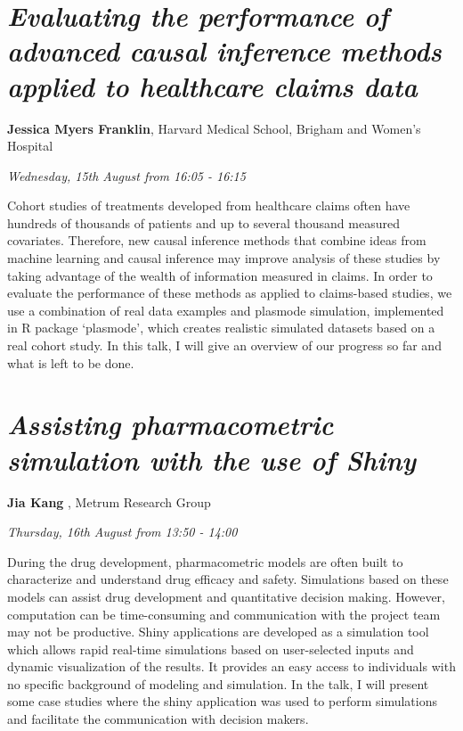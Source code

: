 \documentclass[]{book}
\theoremstyle{definition}
\theoremstyle{definition}
\theoremstyle{definition}
\theoremstyle{remark}
\begin{document}
\hypertarget{evaluating-the-performance-of-advanced-causal-inference-methods-applied-to-healthcare-claims-data}{%
\section{\texorpdfstring{\emph{Evaluating the performance of advanced
causal inference methods applied to healthcare claims
data}}{Evaluating the performance of advanced causal inference methods applied to healthcare claims data}}\label{evaluating-the-performance-of-advanced-causal-inference-methods-applied-to-healthcare-claims-data}}

\textbf{Jessica Myers Franklin}, Harvard Medical School, Brigham and
Women's Hospital

\emph{Wednesday, 15th August from 16:05 - 16:15}

Cohort studies of treatments developed from healthcare claims often have
hundreds of thousands of patients and up to several thousand measured
covariates. Therefore, new causal inference methods that combine ideas
from machine learning and causal inference may improve analysis of these
studies by taking advantage of the wealth of information measured in
claims. In order to evaluate the performance of these methods as applied
to claims-based studies, we use a combination of real data examples and
plasmode simulation, implemented in R package `plasmode', which creates
realistic simulated datasets based on a real cohort study. In this talk,
I will give an overview of our progress so far and what is left to be
done.

\hypertarget{assisting-pharmacometric-simulation-with-the-use-of-shiny}{%
\section{\texorpdfstring{\emph{Assisting pharmacometric simulation with
the use of
Shiny}}{Assisting pharmacometric simulation with the use of Shiny}}\label{assisting-pharmacometric-simulation-with-the-use-of-shiny}}

\textbf{Jia Kang }, Metrum Research Group

\emph{Thursday, 16th August from 13:50 - 14:00}

During the drug development, pharmacometric models are often built to
characterize and understand drug efficacy and safety. Simulations based
on these models can assist drug development and quantitative decision
making. However, computation can be time-consuming and communication
with the project team may not be productive. Shiny applications are
developed as a simulation tool which allows rapid real-time simulations
based on user-selected inputs and dynamic visualization of the results.
It provides an easy access to individuals with no specific background of
modeling and simulation. In the talk, I will present some case studies
where the shiny application was used to perform simulations and
facilitate the communication with decision makers.
\end{document}
